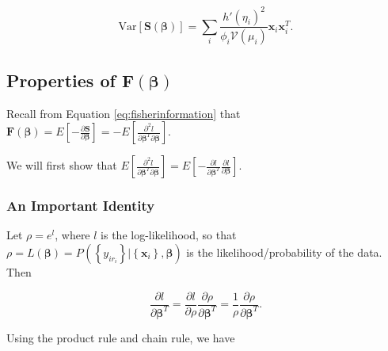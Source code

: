 \documentclass[
  12pt,
]{book}
\begin{document}
\begin{equation}
  {\mathrm{Var}}[\boldsymbol{S}(\boldsymbol{\beta})]
  = \sum_{i} \frac{h'(\eta_{i})^2}{\phi_i \mathcal{V}(\mu_{i})} \boldsymbol{x}_{i} \boldsymbol{x}_{i}^T.
  \label{eq:vars}
\end{equation}

\subsection{\texorpdfstring{Properties of \(\boldsymbol{F}(\boldsymbol{\beta})\)}{Properties of \textbackslash boldsymbol\{F\}(\textbackslash boldsymbol\{\textbackslash beta\})}}\label{properties-of-boldsymbolfboldsymbolbeta}

Recall from Equation \eqref{eq:fisherinformation} that
\(\displaystyle \boldsymbol{F}(\boldsymbol{\beta}) = E \left[ - \frac{\partial \boldsymbol{S} }{ \partial \boldsymbol{\beta}} \right] = - E \left[ \frac{\partial^{2} l}{\partial\boldsymbol{\beta}^{T}\partial\boldsymbol{\beta}} \right]\).

We will first show that
\(\displaystyle E \left[ \frac{\partial^{2} l}{\partial\boldsymbol{\beta}^{T}\partial\boldsymbol{\beta}} \right]
= E \left[ - \frac{\partial l}{\partial \boldsymbol{\beta}^{T}} \frac{\partial l}{\partial\boldsymbol{\beta}} \right]\).

\subsubsection{An Important Identity}\label{an-important-identity}

Let \(\rho = e^l\), where \(l\) is the log-likelihood, so that \(\rho = L(\boldsymbol{\beta}) = P_{}\left(\left\{y_{ir_{i}}\right\} |\left\{\boldsymbol{x}_{i}\right\}, \boldsymbol{\beta}\right)\) is the likelihood/probability of the data. Then

\begin{equation}
  \frac{\partial l}{\partial \boldsymbol{\beta}^{T}}
  = \frac{\partial l}{\partial \rho}\frac{\partial \rho}{\partial \boldsymbol{\beta}^{T}}
  = \frac{1}{\rho}\frac{\partial \rho}{\partial \boldsymbol{\beta}^{T}}.
\end{equation}

Using the product rule and chain rule, we have
\end{document}
